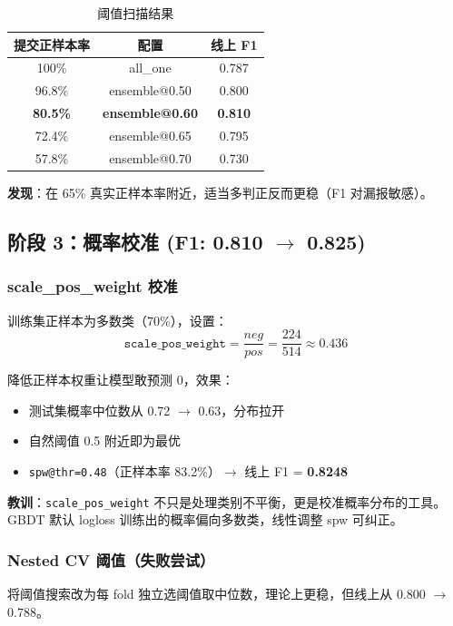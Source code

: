 \documentclass[11pt,a4paper]{article}
\begin{document}
\begin{table}[H]
\centering
\caption{阈值扫描结果}
\begin{tabular}{ccc}
\toprule
提交正样本率 & 配置 & 线上 F1 \\
\midrule
100\% & all\_one & 0.787 \\
96.8\% & ensemble@0.50 & 0.800 \\
\textbf{80.5\%} & \textbf{ensemble@0.60} & \textbf{0.810} \\
72.4\% & ensemble@0.65 & 0.795 \\
57.8\% & ensemble@0.70 & 0.730 \\
\bottomrule
\end{tabular}
\end{table}

\textbf{发现}：在 65\% 真实正样本率附近，适当多判正反而更稳（F1 对漏报敏感）。

\subsection{阶段 3：概率校准 (F1: 0.810 $\to$ 0.825)}

\subsubsection{scale\_pos\_weight 校准}

训练集正样本为多数类（70\%），设置：
\[
\texttt{scale\_pos\_weight} = \frac{neg}{pos} = \frac{224}{514} \approx 0.436
\]

降低正样本权重让模型敢预测 0，效果：
\begin{itemize}[nosep]
    \item 测试集概率中位数从 0.72 $\to$ 0.63，分布拉开
    \item 自然阈值 0.5 附近即为最优
    \item \texttt{spw@thr=0.48}（正样本率 83.2\%）$\to$ 线上 F1 = \textbf{0.8248}
\end{itemize}

\textbf{教训}：\texttt{scale\_pos\_weight} 不只是处理类别不平衡，更是校准概率分布的工具。
GBDT 默认 logloss 训练出的概率偏向多数类，线性调整 spw 可纠正。

\subsubsection{Nested CV 阈值（失败尝试）}

将阈值搜索改为每 fold 独立选阈值取中位数，理论上更稳，但线上从 0.800 $\to$ 0.788。
\end{document}
